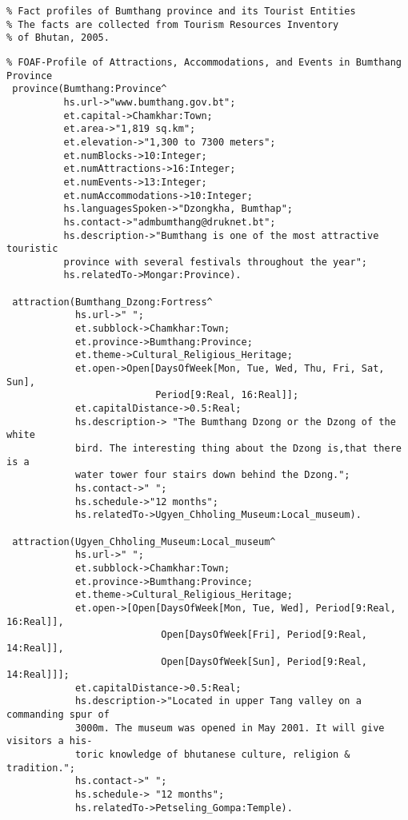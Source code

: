 \singlespacing
\begin{verbatim}
% Fact profiles of Bumthang province and its Tourist Entities
% The facts are collected from Tourism Resources Inventory
% of Bhutan, 2005.
\end{verbatim}
\vspace{-0.25in}
\footnotesize
\begin{verbatim}
% FOAF-Profile of Attractions, Accommodations, and Events in Bumthang Province
 province(Bumthang:Province^
          hs.url->"www.bumthang.gov.bt";
          et.capital->Chamkhar:Town;
          et.area->"1,819 sq.km";
          et.elevation->"1,300 to 7300 meters";
          et.numBlocks->10:Integer;
          et.numAttractions->16:Integer;
          et.numEvents->13:Integer;
          et.numAccommodations->10:Integer;
          hs.languagesSpoken->"Dzongkha, Bumthap";
          hs.contact->"admbumthang@druknet.bt";
          hs.description->"Bumthang is one of the most attractive touristic 
          province with several festivals throughout the year";
          hs.relatedTo->Mongar:Province).
                 
 attraction(Bumthang_Dzong:Fortress^
            hs.url->" ";
            et.subblock->Chamkhar:Town;
            et.province->Bumthang:Province;
            et.theme->Cultural_Religious_Heritage;
            et.open->Open[DaysOfWeek[Mon, Tue, Wed, Thu, Fri, Sat, Sun],
                          Period[9:Real, 16:Real]];
            et.capitalDistance->0.5:Real;
            hs.description-> "The Bumthang Dzong or the Dzong of the white 
            bird. The interesting thing about the Dzong is,that there is a 
            water tower four stairs down behind the Dzong.";
            hs.contact->" ";
            hs.schedule->"12 months";
            hs.relatedTo->Ugyen_Chholing_Museum:Local_museum).
                         
 attraction(Ugyen_Chholing_Museum:Local_museum^
            hs.url->" ";
            et.subblock->Chamkhar:Town;
            et.province->Bumthang:Province;
            et.theme->Cultural_Religious_Heritage;
            et.open->[Open[DaysOfWeek[Mon, Tue, Wed], Period[9:Real, 16:Real]],
                           Open[DaysOfWeek[Fri], Period[9:Real, 14:Real]],
                           Open[DaysOfWeek[Sun], Period[9:Real, 14:Real]]];
            et.capitalDistance->0.5:Real;
            hs.description->"Located in upper Tang valley on a commanding spur of 
            3000m. The museum was opened in May 2001. It will give visitors a his-
            toric knowledge of bhutanese culture, religion & tradition.";
            hs.contact->" ";
            hs.schedule-> "12 months";
            hs.relatedTo->Petseling_Gompa:Temple).
                         

\end{verbatim}
